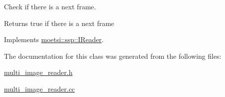 Check if there is a next frame. 

\begin{DoxyReturn}{Returns}
true if there is a next frame 
\end{DoxyReturn}


Implements \hyperlink{classmoetsi_1_1ssp_1_1IReader_af9186ba41e136dc4ec3242b5dd55fa04}{moetsi\+::ssp\+::\+I\+Reader}.



The documentation for this class was generated from the following files\+:\begin{DoxyCompactItemize}
\item 
\hyperlink{multi__image__reader_8h}{multi\+\_\+image\+\_\+reader.\+h}\item 
\hyperlink{multi__image__reader_8cc}{multi\+\_\+image\+\_\+reader.\+cc}\end{DoxyCompactItemize}
